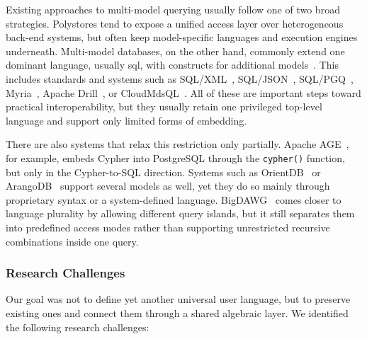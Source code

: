 Existing approaches to multi-model querying usually follow one of two broad strategies. Polystores tend to expose a unified access layer over heterogeneous back-end systems, but often keep model-specific languages and execution engines underneath. Multi-model databases, on the other hand, commonly extend one dominant language, usually \acrshort{sql}, with constructs for additional models~\citep{Jiaheng2023Survey}. This includes standards and systems such as SQL/XML~\citep{SQLXML}, SQL/JSON~\citep{SQLJSON}, SQL/PGQ~\citep{SQLPGQ}, Myria~\citep{conf/cidr/WangBBHHHHJMMMM17}, Apache Drill~\citep{Hausenblas2013ApacheDI}, or CloudMdsQL~\citep{Kolev2016TheCM}. All of these are important steps toward practical interoperability, but they usually retain one privileged top-level language and support only limited forms of embedding.

There are also systems that relax this restriction only partially. Apache AGE~\citep{web:apacheage,github:apacheage}, for example, embeds Cypher into PostgreSQL through the \texttt{cypher()} function, but only in the Cypher-to-SQL direction. Systems such as OrientDB~\citep{orientdb} or ArangoDB~\citep{arangodb} support several models as well, yet they do so mainly through proprietary syntax or a system-defined language. BigDAWG~\citep{journals/sigmod/DugganESBHKMMMZ15} comes closer to language plurality by allowing different query islands, but it still separates them into predefined access modes rather than supporting unrestricted recursive combinations inside one query.

\subsubsection{Research Challenges}

Our goal was not to define yet another universal user language, but to preserve existing ones and connect them through a shared algebraic layer. We identified the following research challenges:



